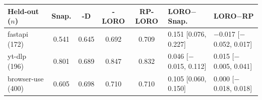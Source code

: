 \begin{tabular}{lccccll}
\toprule
Held-out ($n$) & Snap. & \sys{}-D & \sys{}-LORO & RP-LORO & LORO$-$Snap. & LORO$-$RP \\
\midrule
fastapi (172) & 0.541 & 0.645 & 0.692 & 0.709 & 0.151 [0.076, 0.227] & $-$0.017 [$-$0.052, 0.017] \\
yt-dlp (196) & 0.801 & 0.689 & 0.847 & 0.832 & 0.046 [$-$0.015, 0.112] & 0.015 [$-$0.005, 0.041] \\
browser-use (400) & 0.605 & 0.698 & 0.710 & 0.710 & 0.105 [0.060, 0.150] & 0.000 [$-$0.018, 0.018] \\
\bottomrule
\end{tabular}